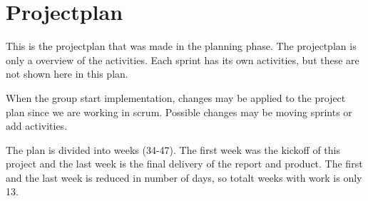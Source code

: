 \section{Projectplan}

	This is the projectplan that was made in the planning phase. The projectplan
	is only a overview of the activities. Each sprint has its own activities, but
	these are not shown here in this plan. 

	When the group start implementation, changes may be applied to the project plan since we
	are working in scrum. Possible changes may be moving sprints or add activities. 

	The plan is divided into weeks (34-47). The first week was the kickoff of this project
	and the last week is the final delivery of the report and product.
	The first and the last week is reduced in number of days, so totalt weeks with work is
	only 13. \\

